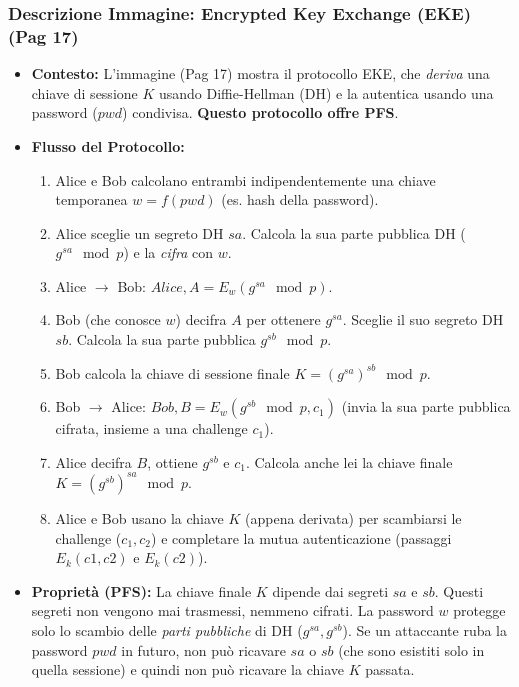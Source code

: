 \documentclass[../main.tex]{subfiles}
\begin{document}
\begin{description}
    \subsubsection*{Descrizione Immagine: Encrypted Key Exchange (EKE) (Pag 17)}
    \begin{itemize}
        \item \textbf{Contesto:} L'immagine (Pag 17) mostra il protocollo EKE, che \emph{deriva} una chiave di sessione $K$ usando Diffie-Hellman (DH) e la autentica usando una password ($pwd$) condivisa. \textbf{Questo protocollo offre PFS}.
        \item \textbf{Flusso del Protocollo:}
              \begin{enumerate}
                  \item Alice e Bob calcolano entrambi indipendentemente una chiave temporanea $w = f(pwd)$ (es. hash della password).
                  \item Alice sceglie un segreto DH $sa$. Calcola la sua parte pubblica DH ($g^{sa} \mod p$) e la \emph{cifra} con $w$.
                  \item Alice $\to$ Bob: $Alice, A = E_w(g^{sa} \mod p)$.
                  \item Bob (che conosce $w$) decifra $A$ per ottenere $g^{sa}$. Sceglie il suo segreto DH $sb$. Calcola la sua parte pubblica $g^{sb} \mod p$.
                  \item Bob calcola la chiave di sessione finale $K = (g^{sa})^{sb} \mod p$.
                  \item Bob $\to$ Alice: $Bob, B = E_w(g^{sb} \mod p, c_1)$ (invia la sua parte pubblica cifrata, insieme a una challenge $c_1$).
                  \item Alice decifra $B$, ottiene $g^{sb}$ e $c_1$. Calcola anche lei la chiave finale $K = (g^{sb})^{sa} \mod p$.
                  \item Alice e Bob usano la chiave $K$ (appena derivata) per scambiarsi le challenge ($c_1, c_2$) e completare la mutua autenticazione (passaggi $E_k(c1, c2)$ e $E_k(c2)$).
              \end{enumerate}
        \item \textbf{Proprietà (PFS):} La chiave finale $K$ dipende dai segreti $sa$ e $sb$. Questi segreti non vengono mai trasmessi, nemmeno cifrati. La password $w$ protegge solo lo scambio delle \emph{parti pubbliche} di DH ($g^{sa}, g^{sb}$). Se un attaccante ruba la password $pwd$ in futuro, non può ricavare $sa$ o $sb$ (che sono esistiti solo in quella sessione) e quindi non può ricavare la chiave $K$ passata.
    \end{itemize}
\end{description}
\end{document}
